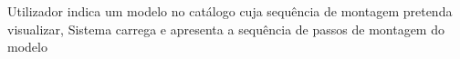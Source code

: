             {
                Utilizador indica um modelo no catálogo cuja sequência de montagem pretenda visualizar,
                Sistema carrega e apresenta a sequência de passos de montagem do modelo
            }

